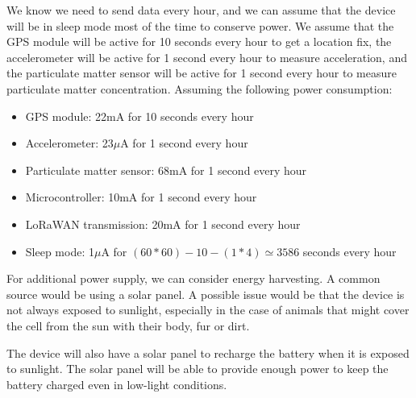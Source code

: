 We know we need to send data every hour, and we can assume that the device will be in sleep mode most of the time to conserve power.
We assume that the GPS module will be active for 10 seconds every hour to get a location fix, the accelerometer will be active for 1 second every hour to measure acceleration, and the particulate matter sensor will be active for 1 second every hour to measure particulate matter concentration.
Assuming the following power consumption:
\begin{itemize}
  \item GPS module: 22mA for 10 seconds every hour
  \item Accelerometer: 23$\mu$A for 1 second every hour
  \item Particulate matter sensor: 68mA for 1 second every hour
  \item Microcontroller: 10mA for 1 second every hour
  \item LoRaWAN transmission: 20mA for 1 second every hour
  \item Sleep mode: 1$\mu$A for $(60*60) - 10 - (1*4) \simeq 3586$ seconds every hour
\end{itemize}



For additional power supply, we can consider energy harvesting. 
A common source would be using a solar panel. A possible issue would be that the device is not always exposed to sunlight, especially in the case of animals that might cover the cell from the sun with their body, fur or dirt.


The device will also have a solar panel to recharge the battery when it is exposed to sunlight. The solar panel will be able to provide enough power to keep the battery charged even in low-light conditions.

